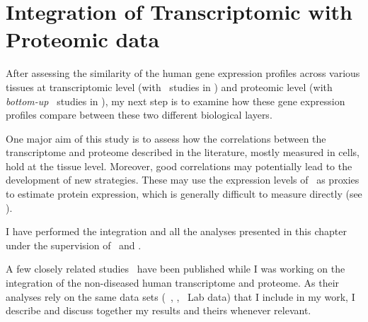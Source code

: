 \chapter{Integration of Transcriptomic with Proteomic data}\label{ch:Integration}
\setlength{\epigraphwidth}{0.8\textwidth}
\setlength{\epigraphrule}{0pt}

\vspace{2cm}
After assessing the similarity of the human gene expression profiles
across various tissues
at transcriptomic level (with \Rnaseq\ studies in )
and proteomic level (with \emph{bottom-up} \ms\ studies in ),
my next step is to examine how these gene expression profiles
compare between these two different biological layers.\mybr\

One major aim of this study is to assess
how the correlations between the transcriptome and proteome
described in the literature, mostly measured in cells,
hold at the tissue level.
Moreover, good correlations may potentially lead to
the development of new strategies.
These may use the expression levels of \mRNA\ as proxies
to estimate protein expression,
which is generally difficult to measure directly (see ).\mybr\

I have performed the integration and all the analyses presented in this chapter
under the supervision of \alvis\ and \jyoti{}.\mybr\

A few closely related studies~ have
been published while I was working on
the integration of the non-diseased human transcriptome and proteome.
As their analyses rely on the same data sets (\ie\ \uhlen, \gtex, \pandey\ Lab data)
that I include in my work,
I describe and discuss together my results and theirs
whenever relevant.\mybr\


